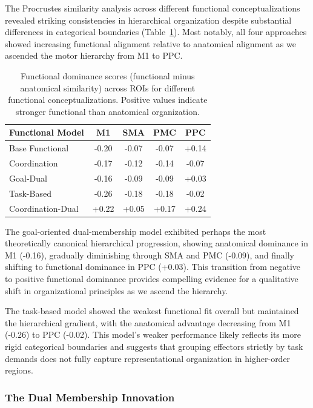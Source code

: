 \documentclass{article}
\begin{document}
The Procrustes similarity analysis across different functional conceptualizations revealed striking consistencies in hierarchical organization despite substantial differences in categorical boundaries (Table~\ref{tab:procrustes_comparison_ext}). Most notably, all four approaches showed increasing functional alignment relative to anatomical alignment as we ascended the motor hierarchy from M1 to PPC.

\begin{table}[h]
\centering
\small
\begin{tabular}{|l|c|c|c|c|}
\hline
\textbf{Functional Model} & \textbf{M1} & \textbf{SMA} & \textbf{PMC} & \textbf{PPC} \\
\hline
Base Functional & -0.20 & -0.07 & -0.07 & +0.14 \\
Coordination & -0.17 & -0.12 & -0.14 & -0.07 \\
Goal-Dual & -0.16 & -0.09 & -0.09 & +0.03 \\
Task-Based & -0.26 & -0.18 & -0.18 & -0.02 \\
Coordination-Dual & +0.22 & +0.05 & +0.17 & +0.24 \\
\hline
\end{tabular}
\caption{Functional dominance scores (functional minus anatomical similarity) across ROIs for different functional conceptualizations. Positive values indicate stronger functional than anatomical organization.}
\label{tab:procrustes_comparison_ext}
\end{table}

The goal-oriented dual-membership model exhibited perhaps the most theoretically canonical hierarchical progression, showing anatomical dominance in M1 (-0.16), gradually diminishing through SMA and PMC (-0.09), and finally shifting to functional dominance in PPC (+0.03). This transition from negative to positive functional dominance provides compelling evidence for a qualitative shift in organizational principles as we ascend the hierarchy.

The task-based model showed the weakest functional fit overall but maintained the hierarchical gradient, with the anatomical advantage decreasing from M1 (-0.26) to PPC (-0.02). This model's weaker performance likely reflects its more rigid categorical boundaries and suggests that grouping effectors strictly by task demands does not fully capture representational organization in higher-order regions.

\subsubsection{The Dual Membership Innovation}
\end{document}
